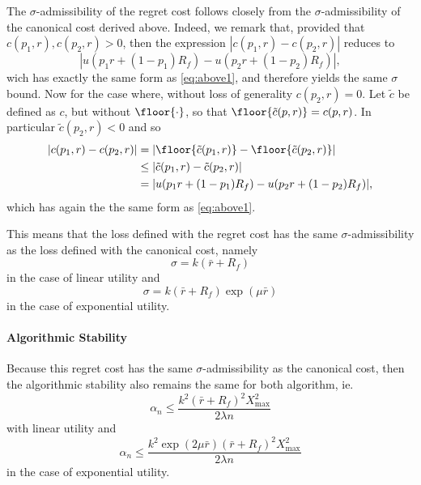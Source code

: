 \begin{rem}
  The $\sigma$-admissibility of the regret cost follows closely from the
  $\sigma$-admissibility of the canonical cost derived above. Indeed, we remark that,
  provided that $c(p_1,r), c(p_2,r) > 0$, then the expression $|c(p_1,r) - c(p_2,r)|$
  reduces to 
  \begin{equation*}
    |u(p_1r + (1-p_1)R_f) - u(p_2r + (1-p_2)R_f)|,
  \end{equation*}
  wich has exactly the same form as \eqref{eq:above1}, and therefore yields the same
  $\sigma$ bound. Now for the case where, without loss of generality $c(p_2,r) = 0$. Let
  $\tilde c$ be defined as $c$, but without $\floor{\cdot}$, so that
  $\floor{\tilde{c}(p,r)} = c(p,r)$. In particular $\tilde c(p_2,r)<0$ and so
  \begin{align*}
    |c(p_1,r) - c(p_2,r)| &= |\floor{\tilde c(p_1,r)} - \floor{\tilde c(p_2,r)}|\\
    &\leq |\tilde c(p_1,r) - \tilde c(p_2,r)|\\
    &= |u(p_1r + (1-p_1)R_f) - u(p_2r + (1-p_2)R_f)|,
  \end{align*}
  which has again the the same form as \eqref{eq:above1}.

  This means that the loss defined with the regret cost has the same
  $\sigma$-admissibility as the loss defined with the canonical cost, namely 
  \begin{equation*}
    \sigma = k(\bar r + R_f)
  \end{equation*}
  in the case of linear utility and 
  \begin{equation*}
    \sigma = k(\bar r+R_f) \exp(\mu\bar r)
  \end{equation*}
  in the case of exponential utility. 
\end{rem}

\paragraph{Algorithmic Stability}
  Because this regret cost has the same $\sigma$-admissibility as the canonical cost, then
  the algorithmic stability also remains the same for both algorithm, ie.
  \begin{equation*}
    \alpha_n \leq \frac{k^2(\bar r+R_f)^2X^2_{\max}}{2\lambda n}
  \end{equation*}
  with linear utility and
  \begin{equation*}
    \alpha_n \leq \frac{k^2 \exp(2\mu\bar r)(\bar r + R_f)^2 X^2_{\max}}{2\lambda n}
  \end{equation*}
  in the case of exponential utility.


